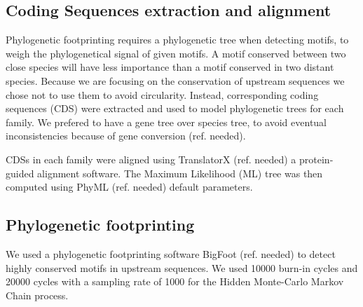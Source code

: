 \subsection{Coding Sequences extraction and alignment}

Phylogenetic footprinting requires a phylogenetic tree when detecting motifs, to weigh the phylogenetical signal of given motifs. A motif conserved between two close species will have less importance than a motif conserved in two distant species. Because we are focusing on the conservation of upstream sequences we chose not to use them to avoid circularity. Instead, corresponding coding sequences (CDS) were extracted and used to model phylogenetic trees for each family. We prefered to have a gene tree over species tree, to avoid eventual inconsistencies because of gene conversion (ref. needed).

CDSs in each family were aligned using TranslatorX (ref. needed) a protein-guided alignment software. The Maximum Likelihood (ML) tree was then computed using PhyML (ref. needed) default parameters.

\subsection{Phylogenetic footprinting}

We used a phylogenetic footprinting software BigFoot (ref. needed) to detect highly conserved motifs in upstream sequences. We used 10000 burn-in cycles and 20000 cycles with a sampling rate of 1000 for the Hidden Monte-Carlo Markov Chain process.

